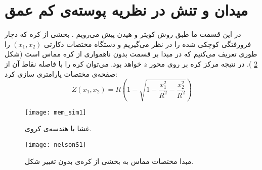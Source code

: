 \section{میدان و تنش در نظریه پوسته‌ی کم عمق}
در این قسمت ما طبق روش کویتر
و
هیدن
پیش می‌‌رویم
\cite{Heijden2008WTK}
. بخشی از کره که دچار فرورفتگی کوچکی شده را در نظر می‌گیریم و دستگاه مختصات دکارتی 
$(x_1,x_2)$
را طوری تعریف می‌کنیم که در مبدا بر قسمت بدون ناهمواری از کره مماس است (شکل 
\ref{fig:nelson_figs1}
). در نتیجه مرکز کره بر روی محور 
$z$
خواهد بود. می‌توان کره را با فاصله نقاط آن از صفحه‌ی مختصات پارامتری سازی کرد:
\begin{equation}
Z(x_1,x_2) = R\left(1-\sqrt{1-\frac{x_1^2}{R^2}-\frac{x_2^2}{R^2}}\right)
\label{eq:nelsonS1}
\end{equation}
\begin{figure}[h]
\begin{center}
\texttt{[image: mem\_sim1]}
\caption{
غشا با هندسه‌ی کروی.
}
\label{fig:mem1}
\end{center}
\end{figure}
\begin{figure}[h]
\begin{center}
\texttt{[image: nelsonS1]}
\caption{
مبدا مختصات مماس به بخشی از کره‌ی بدون تغییر شکل.ٓ
}
\label{fig:nelson_figs1}
\end{center}
\end{figure}

